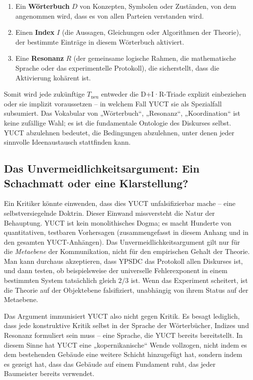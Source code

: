 \documentclass[12pt,a4paper]{article}
\begin{document}
\begin{enumerate}
	\item Ein \textbf{Wörterbuch} \(D\) von Konzepten, Symbolen oder Zuständen, von dem angenommen wird, dass es von allen Parteien verstanden wird.
	\item Einen \textbf{Index} \(I\) (die Aussagen, Gleichungen oder Algorithmen der Theorie), der bestimmte Einträge in diesem Wörterbuch aktiviert.
	\item Eine \textbf{Resonanz} \(R\) (der gemeinsame logische Rahmen, die mathematische Sprache oder das experimentelle Protokoll), die sicherstellt, dass die Aktivierung kohärent ist.
\end{enumerate}

Somit wird jede zukünftige \(T_{\text{neu}}\) entweder die D+I·R-Triade explizit einbeziehen oder sie implizit voraussetzen – in welchem Fall YUCT sie als Spezialfall subsumiert. Das Vokabular von „Wörterbuch“, „Resonanz“, „Koordination“ ist keine zufällige Wahl; es ist die fundamentale Ontologie des Diskurses selbst. YUCT abzulehnen bedeutet, die Bedingungen abzulehnen, unter denen jeder sinnvolle Ideenaustausch stattfinden kann.

\subsection{Das Unvermeidlichkeitsargument: Ein Schachmatt oder eine Klarstellung?}

Ein Kritiker könnte einwenden, dass dies YUCT unfalsifizierbar mache – eine selbstversiegelnde Doktrin. Dieser Einwand missversteht die Natur der Behauptung. YUCT ist kein monolithisches Dogma; es macht Hunderte von quantitativen, testbaren Vorhersagen (zusammengefasst in diesem Anhang und in den gesamten YUCT-Anhängen). Das Unvermeidlichkeitsargument gilt nur für die \emph{Metaebene} der Kommunikation, nicht für den empirischen Gehalt der Theorie. Man kann durchaus akzeptieren, dass YPSDC das Protokoll allen Diskurses ist, und dann testen, ob beispielsweise der universelle Fehlerexponent in einem bestimmten System tatsächlich gleich \(2/3\) ist. Wenn das Experiment scheitert, ist die Theorie auf der Objektebene falsifiziert, unabhängig von ihrem Status auf der Metaebene.

Das Argument immunisiert YUCT also nicht gegen Kritik. Es besagt lediglich, dass jede konstruktive Kritik selbst in der Sprache der Wörterbücher, Indizes und Resonanz formuliert sein muss – eine Sprache, die YUCT bereits bereitstellt. In diesem Sinne hat YUCT eine „kopernikanische“ Wende vollzogen, nicht indem es dem bestehenden Gebäude eine weitere Schicht hinzugefügt hat, sondern indem es gezeigt hat, dass das Gebäude auf einem Fundament ruht, das jeder Baumeister bereits verwendet.
\end{document}
